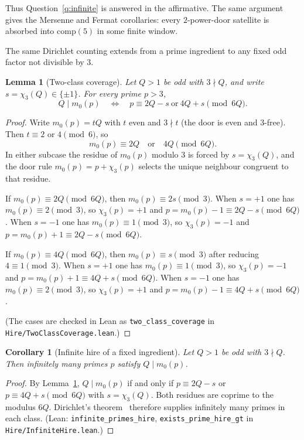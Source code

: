 \documentclass[11pt,a4paper]{article}
\newtheorem{lemma}{Lemma}
\newtheorem{corollary}{Corollary}
\begin{document}
Thus Question~\ref{q:infinite} is answered in the affirmative.
The same argument gives the Mersenne and Fermat corollaries: every \(2\)-power-door satellite is absorbed into \(\mathrm{comp}(5)\) in some finite window.

The same Dirichlet counting extends from a prime ingredient to any fixed odd factor not divisible by \(3\).

\begin{lemma}[Two-class coverage]
\label{lem:two-class}
Let \(Q>1\) be odd with \(3\nmid Q\), and write \(s=\chi_3(Q)\in\{\pm 1\}\).
For every prime \(p>3\),
\[
Q\mid m_0(p)
\quad\Longleftrightarrow\quad
p\equiv 2Q-s\ \text{or}\ 4Q+s\pmod{6Q}.
\]
\end{lemma}

\begin{proof}
Write \(m_0(p)=tQ\) with \(t\) even and \(3\nmid t\) (the door is even and 3-free).
Then \(t\equiv 2\) or \(4\pmod{6}\), so
\[
m_0(p)\equiv 2Q\quad\text{or}\quad 4Q\pmod{6Q}.
\]
In either subcase the residue of \(m_0(p)\) modulo \(3\) is forced by \(s=\chi_3(Q)\), and the door rule \(m_0(p)=p+\chi_3(p)\) selects the unique neighbour congruent to that residue.

If \(m_0(p)\equiv 2Q\pmod{6Q}\), then \(m_0(p)\equiv 2s\pmod{3}\).
When \(s=+1\) one has \(m_0(p)\equiv 2\pmod{3}\), so \(\chi_3(p)=+1\) and \(p=m_0(p)-1\equiv 2Q-s\pmod{6Q}\).
When \(s=-1\) one has \(m_0(p)\equiv 1\pmod{3}\), so \(\chi_3(p)=-1\) and \(p=m_0(p)+1\equiv 2Q-s\pmod{6Q}\).

If \(m_0(p)\equiv 4Q\pmod{6Q}\), then \(m_0(p)\equiv s\pmod{3}\) after reducing \(4\equiv 1\pmod{3}\).
When \(s=+1\) one has \(m_0(p)\equiv 1\pmod{3}\), so \(\chi_3(p)=-1\) and \(p=m_0(p)+1\equiv 4Q+s\pmod{6Q}\).
When \(s=-1\) one has \(m_0(p)\equiv 2\pmod{3}\), so \(\chi_3(p)=+1\) and \(p=m_0(p)-1\equiv 4Q+s\pmod{6Q}\).

(The cases are checked in Lean as \texttt{two\_class\_coverage} in \texttt{Hire/TwoClassCoverage.lean}.)
\end{proof}

\begin{corollary}[Infinite hire of a fixed ingredient]
\label{cor:infinite-hire}
Let \(Q>1\) be odd with \(3\nmid Q\).
Then infinitely many primes \(p\) satisfy \(Q\mid m_0(p)\).
\end{corollary}

\begin{proof}
By Lemma~\ref{lem:two-class}, \(Q\mid m_0(p)\) if and only if
\(p\equiv 2Q-s\) or \(p\equiv 4Q+s\pmod{6Q}\) with \(s=\chi_3(Q)\).
Both residues are coprime to the modulus \(6Q\).
Dirichlet's theorem~\cite{Dirichlet} therefore supplies infinitely many primes in each class.
(Lean: \texttt{infinite\_primes\_hire}, \texttt{exists\_prime\_hire\_gt} in \texttt{Hire/InfiniteHire.lean}.)
\end{proof}
\end{document}
